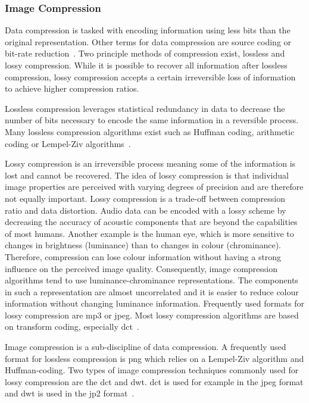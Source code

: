 \subsubsection{Image Compression} \label{sec:t_compress}
Data compression is tasked with encoding information using less bits than the original representation. Other terms for data compression are source coding or bit-rate reduction~\cite{Mahdi2012ImplementingTechnique}. Two principle methods of compression exist, lossless and lossy compression. While it is possible to recover all information after lossless compression, lossy compression accepts a certain irreversible loss of information to achieve higher compression ratios.

Lossless compression leverages statistical redundancy in data to decrease the number of bits necessary to encode the same information in a reversible process. Many lossless compression algorithms exist such as Huffman coding, arithmetic coding or Lempel-Ziv algorithms~\cite{Bocharova2009CompressionMultimedia}.

Lossy compression is an irreversible process meaning some of the information is lost and cannot be recovered. The idea of lossy compression is that individual image properties are perceived with varying degrees of precision and are therefore not equally important. Lossy compression is a trade-off between compression ratio and data distortion. Audio data can be encoded with a lossy scheme by decreasing the accuracy of acoustic components that are beyond the capabilities of most humans. Another example is the human eye, which is more sensitive to changes in brightness (luminance) than to changes in colour (chrominance). Therefore, compression can lose colour information without having a strong influence on the perceived image quality. Consequently, image compression algorithms tend to use luminance-chrominance representations. The components in such a representation are almost uncorrelated and it is easier to reduce colour information without changing luminance information. Frequently used formats for lossy compression are \gls{mp3} or \gls{jpeg}. Most lossy compression algorithms are based on transform coding, especially \gls{dct}~\cite{Bocharova2009CompressionMultimedia}.

Image compression is a sub-discipline of data compression. A frequently used format for lossless compression is \gls{png} which relies on a Lempel-Ziv algorithm and Huffman-coding. Two types of image compression techniques commonly used for lossy compression are the \gls{dct} and \gls{dwt}. \Gls{dct} is used for example in the \gls{jpeg} format and \gls{dwt} is used in the \gls{jp2} format~\cite{Bocharova2009CompressionMultimedia}.

